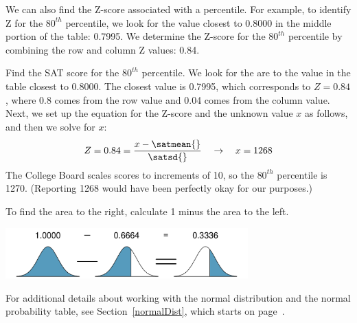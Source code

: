 We can also find the Z-score associated with a percentile.
For example, to identify Z for the $80^{th}$ percentile,
we look for the value closest to 0.8000 in the middle portion
of the table: 0.7995.
We determine the Z-score for the $80^{th}$ percentile by
combining the row and column Z values: 0.84.

\begin{examplewrap}
\begin{nexample}{Find the SAT score for the $80^{th}$ percentile.}
  We look for the are to the value in the table closest to 0.8000.
  The closest value is 0.7995, which corresponds to $Z = 0.84$,
  where 0.8 comes from the row value and 0.04 comes from the
  column value.
  Next, we set up the equation for the Z-score and the unknown
  value $x$ as follows, and then we solve for $x$:
  \begin{align*}
  Z = 0.84 = \frac{x - \satmean{}}{\satsd{}}
  \quad\to\quad x = 1268
  \end{align*}
  The College Board scales scores to increments of 10,
  so the $80^{th}$ percentile is 1270.
  (Reporting 1268 would have been perfectly okay for our purposes.)
\end{nexample}
\end{examplewrap}

To find the area to the right, calculate 1 minus the area to the left.\vspace{1mm}
\begin{center}
\includegraphics[width=0.7\textwidth]{extraTeX/tables/figures/normalTails/subtractingArea/subtractingArea}\vspace{3mm}
\end{center}
For additional details about working with the normal distribution and the normal probability table, see Section~\ref{normalDist}, which starts on page~\pageref{normalDist}.

